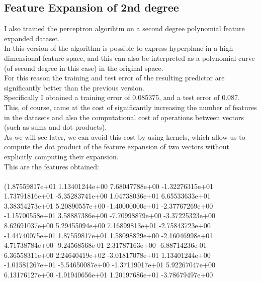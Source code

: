 \subsection{Feature Expansion of 2nd degree}

I also trained the perceptron algorihtm on a second degree polynomial feature expanded dataset.\\
In this version of the algorithm is possible to express hyperplane in a high dimensional feature space, and this can also be interpreted as a polynomial curve (of second degree in this case) in the original space.\\
For this reason the training and test error of the resulting predictor are significantly better than the previous version.\\
Specifically I obtained a training error of 0.085375, and a test error of 0.087.\\
This, of course, came at the cost of significantly increasing the number of features in the datasets and also the computational cost of operations between vectors (such as sums and dot products).\\
As we will see later, we can avoid this cost by using kernels, which allow us to compute the dot product of the feature expansion of two vectors without explicitly computing their expansion.\\ 
This are the features obtained:\\\\
(1.87559817e+01  1.13401244e+00  7.68047788e+00 -1.32276315e+01\\
  1.73791816e+01 -5.35283741e+00  1.04738036e+01  6.65533633e+01\\
  3.38354273e+01  5.20890557e+00 -1.40000000e+01 -2.37767269e+00\\
 -1.15700558e+01  3.58887386e+00 -7.70998879e+00 -3.37225323e+00\\
  8.62691037e+00  5.29455094e+00  7.16899813e+01 -2.75843723e+00\\
 -1.44740075e+01  1.87559817e+01  1.58098829e+00 -2.16046998e+01\\
  4.71738784e+00 -9.24568568e-01  2.31787163e+00 -6.88714236e-01\\
  6.36558311e+00  2.24640419e+02 -3.01817078e+01  1.13401244e+00\\
 -1.01581267e+01 -5.54650087e+00 -1.37119017e+01  5.92267047e+00\\
  6.13176127e+00 -1.91940656e+01  1.20197686e+01 -3.78679497e+00\\
